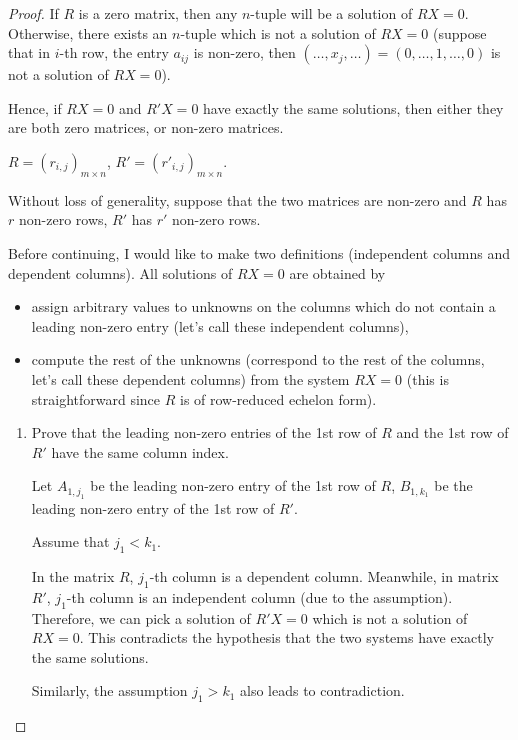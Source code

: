 \begin{proof}
    If $R$ is a zero matrix, then any $n$-tuple will be a solution of $RX = 0$. Otherwise, there exists an $n$-tuple which is not a solution of $RX = 0$ (suppose that in $i$-th row, the entry $a_{ij}$ is non-zero, then $(\ldots, x_{j}, \ldots) = (0, \ldots, 1, \ldots, 0)$ is not a solution of $RX = 0$).

    Hence, if $RX = 0$ and $R'X = 0$ have exactly the same solutions, then either they are both zero matrices, or non-zero matrices.

    $R = {(r_{i,j})}_{m\times n}$, $R' = {(r'_{i,j})}_{m\times n}$.

    Without loss of generality, suppose that the two matrices are non-zero and $R$ has $r$ non-zero rows, $R'$ has $r'$ non-zero rows.

    Before continuing, I would like to make two definitions (independent columns and dependent columns). All solutions of $RX = 0$ are obtained by
    \begin{itemize}
        \item assign arbitrary values to unknowns on the columns which do not contain a leading non-zero entry (let's call these independent columns),
        \item compute the rest of the unknowns (correspond to the rest of the columns, let's call these dependent columns) from the system $RX = 0$ (this is straightforward since $R$ is of row-reduced echelon form).
    \end{itemize}

    \begin{enumerate}[label={\textbf{Step \arabic*.}},itemindent=0.5cm]
        \item Prove that the leading non-zero entries of the 1st row of $R$ and the 1st row of $R'$ have the same column index.

              Let $A_{1,j_{1}}$ be the leading non-zero entry of the 1st row of $R$, $B_{1,k_{1}}$ be the leading non-zero entry of the 1st row of $R'$.

              Assume that $j_{1} < k_{1}$.

              In the matrix $R$, $j_{1}$-th column is a dependent column. Meanwhile, in matrix $R'$, $j_{1}$-th column is an independent column (due to the assumption). Therefore, we can pick a solution of $R'X = 0$ which is not a solution of $RX = 0$. This contradicts the hypothesis that the two systems have exactly the same solutions.

              Similarly, the assumption $j_{1} > k_{1}$ also leads to contradiction.


\end{enumerate}
\end{proof}
